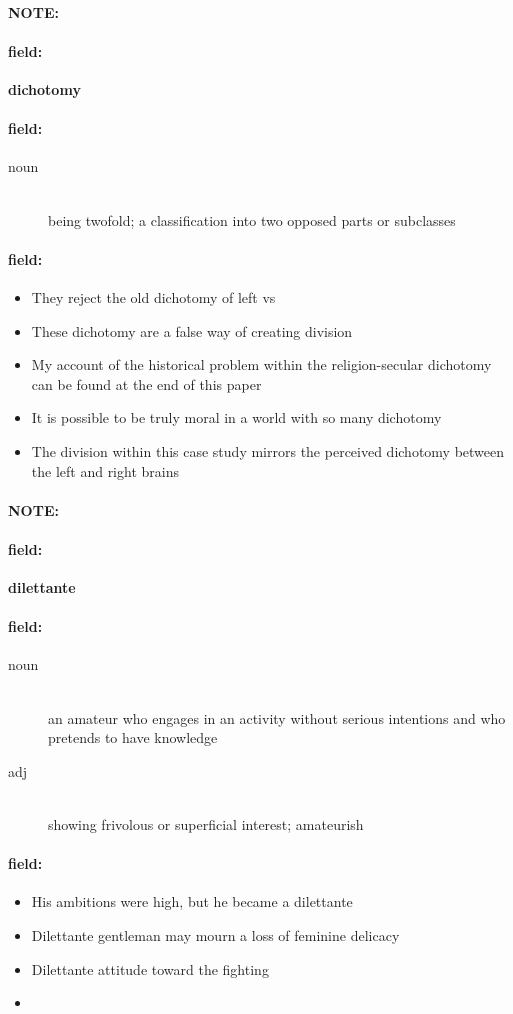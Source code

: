 \documentclass[12pt]{article}
\newenvironment{note}{\paragraph{NOTE:}}{}
\newenvironment{field}{\paragraph{field:}}{}
\begin{document}
\begin{note}
\begin{field}
\textbf{\large dichotomy}
\end{field}


\begin{field}
\begin{description}
\item[noun] \hfill \\ 
being twofold; a classification into two opposed parts or subclasses

\end{description}
\end{field}

\begin{field}
\begin{itemize}
\item They reject the old dichotomy of left vs
\item These dichotomy are a false way of creating division
\item My account of the historical problem within the religion-secular dichotomy can be found at the end of this paper
\item It is possible to be truly moral in a world with so many dichotomy
\item The division within this case study mirrors the perceived dichotomy between the left and right brains
\end{itemize}
\end{field}
\end{note}
\begin{note}
\begin{field}
\textbf{\large dilettante}
\end{field}


\begin{field}
\begin{description}
\item[noun] \hfill \\ 
an amateur who engages in an activity without serious intentions and who pretends to have knowledge

\item[adj] \hfill \\ 
showing frivolous or superficial interest; amateurish

\end{description}
\end{field}

\begin{field}
\begin{itemize}
\item His ambitions were high, but he became a dilettante
\item Dilettante gentleman may mourn a loss of feminine delicacy
\item Dilettante attitude toward the fighting
\item 
\end{itemize}
\end{field}
\end{note}
\end{document}
